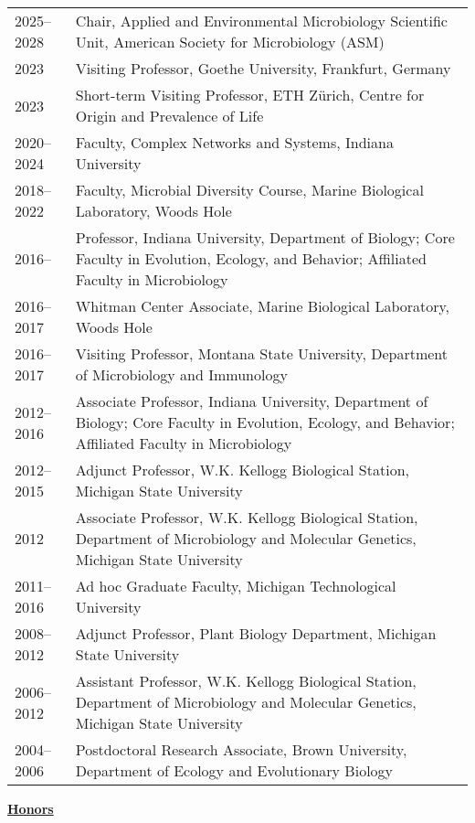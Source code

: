 \documentclass[11pt]{article}  %
\begin{document}
\begin{tabularx}{\textwidth}{@{}l@{\hspace{2em}}X@{}}
2025--2028  & Chair, Applied and Environmental Microbiology Scientific Unit, American Society for Microbiology (ASM) \\
2023         & Visiting Professor, Goethe University, Frankfurt, Germany \\
2023         & Short-term Visiting Professor, ETH Zürich, Centre for Origin and Prevalence of Life \\
2020--2024   & Faculty, Complex Networks and Systems, Indiana University \\
2018--2022   & Faculty, Microbial Diversity Course, Marine Biological Laboratory, Woods Hole \\
2016--       & Professor, Indiana University, Department of Biology; Core Faculty in Evolution, Ecology, and Behavior; Affiliated Faculty in Microbiology \\
2016--2017   & Whitman Center Associate, Marine Biological Laboratory, Woods Hole \\
2016--2017   & Visiting Professor, Montana State University, Department of Microbiology and Immunology \\
2012--2016   & Associate Professor, Indiana University, Department of Biology; Core Faculty in Evolution, Ecology, and Behavior; Affiliated Faculty in Microbiology \\
2012--2015   & Adjunct Professor, W.K. Kellogg Biological Station, Michigan State University \\
2012         & Associate Professor, W.K. Kellogg Biological Station, Department of Microbiology and Molecular Genetics, Michigan State University \\
2011--2016   & Ad hoc Graduate Faculty, Michigan Technological University \\
2008--2012   & Adjunct Professor, Plant Biology Department, Michigan State University \\
2006--2012   & Assistant Professor, W.K. Kellogg Biological Station, Department of Microbiology and Molecular Genetics, Michigan State University \\
2004--2006   & Postdoctoral Research Associate, Brown University, Department of Ecology and Evolutionary Biology \\
\end{tabularx}

\vspace{-1.5em} %
\noindent\underline{\textbf{Honors}}\\[-2.5em] %
\noindent
\end{document}
